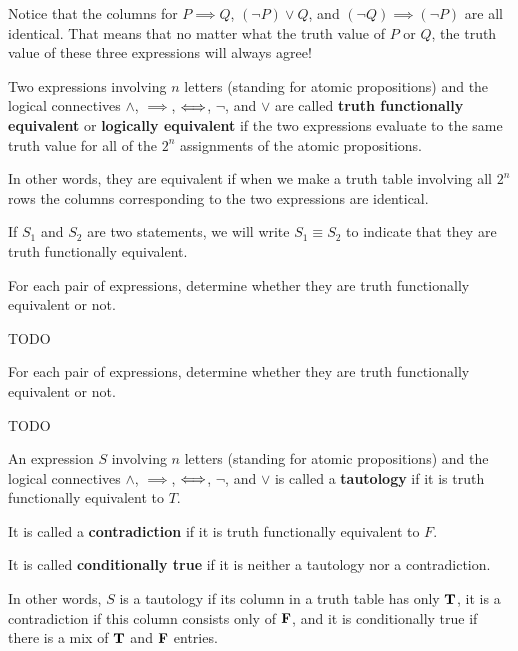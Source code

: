 Notice that the columns for $P \implies Q$,  $(\neg P) \vee Q$, and $(\neg Q) \implies (\neg P)$ are all identical.  That means that no matter what the truth value of $P$ or $Q$, the truth value of these three expressions will always agree! 

\begin{definition}
		Two expressions involving $n$ letters (standing for atomic propositions) and the logical connectives $\wedge$, $\implies$, $\Longleftrightarrow$, $\neg$, and $\vee$ are called \textbf{truth functionally equivalent} or \textbf{logically equivalent} if the two expressions evaluate to the same truth value for all of the $2^n$ assignments of the atomic propositions.
		
		In other words, they are equivalent if when we make a truth table involving all $2^n$ rows the columns corresponding to the two expressions are identical.
		
		If $S_1$ and $S_2$ are two statements, we will write $S_1 \equiv S_2$ to indicate that they are truth functionally equivalent.
	\end{definition}

\begin{xca}
		For each pair of expressions, determine whether they are truth functionally equivalent or not.
		
		TODO
	\end{xca}

\begin{solutions}
	For each pair of expressions, determine whether they are truth functionally equivalent or not.
	
	TODO
\end{solutions}

\begin{definition}
		An expression $S$ involving $n$ letters (standing for atomic propositions) and the logical connectives $\wedge$, $\implies$, $\Longleftrightarrow$, $\neg$, and $\vee$ is called a \textbf{tautology} if it is truth functionally equivalent to $T$.  
		
		It is called a \textbf{contradiction} if it is truth functionally equivalent to $F$.
		
		It is called  \textbf{conditionally true} if it is neither a tautology nor a contradiction.
		
		In other words, $S$ is a tautology if its column in a truth table has only $\textbf{\textrm{T}}$, it is a contradiction if this column consists only of $\textbf{\textrm{F}}$, and it is conditionally true if there is a mix of $\textbf{\textrm{T}}$ and $\textbf{\textrm{F}}$ entries.
	
	\end{definition}

